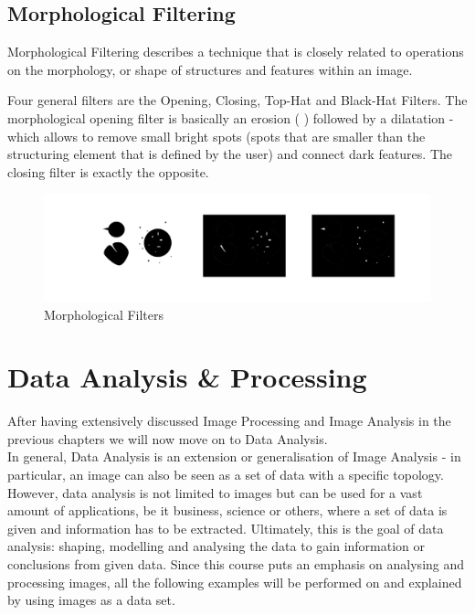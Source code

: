 \subsection{Morphological Filtering}
Morphological Filtering describes a technique that is closely related to operations on the morphology, or shape of structures and features within an image.

Four general filters are the Opening, Closing, Top-Hat and Black-Hat Filters. The morphological opening filter is basically an erosion ( ) followed by a dilatation - which allows to remove small bright spots (spots that are smaller than the structuring element that is defined by the user) and connect dark features. The closing filter is exactly the opposite.


\begin{figure}[H]
	\centering
	\includegraphics[width=\textwidth]{images/morphFilter.png}
	\caption{Morphological Filters}
	\label{fig:morphFilt}
\end{figure}




\section{Data Analysis \& Processing}
After having extensively discussed Image Processing and Image Analysis in the previous chapters we will now move on to Data Analysis. \\In general, Data Analysis is an extension or generalisation of Image Analysis - in particular, an image can also be seen as a set of data with a specific topology. However, data analysis is not limited to images but can be used for a vast amount of applications, be it business, science or others, where a set of data is given and information has to be extracted. Ultimately, this is the goal of data analysis: shaping, modelling and analysing the data to gain information or conclusions from given data.
Since this course puts an emphasis on analysing and processing images, all the following examples will be performed on and explained by using images as a data set.

